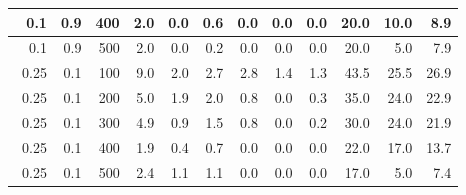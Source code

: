 \begin{longtable}{|r|r|r|r|r|r|r|r|r|r|r|r|}
        \hline \
        0.1                           & 0.9                     & 400                       & 2.0                       & 0.0                       & 0.6                       & 0.0                       & 0.0                       & 0.0                       & 20.0                      & 10.0                      & 8.9                      \\
        \hline \
        0.1                           & 0.9                     & 500                       & 2.0                       & 0.0                       & 0.2                       & 0.0                       & 0.0                       & 0.0                       & 20.0                      & 5.0                      & 7.9                      \\
        \hline \
        0.25                           & 0.1                     & 100                       & 9.0                       & 2.0                       & 2.7                       & 2.8                       & 1.4                       & 1.3                       & 43.5                      & 25.5                      & 26.9                      \\
        \hline \
        0.25                           & 0.1                     & 200                       & 5.0                       & 1.9                       & 2.0                       & 0.8                       & 0.0                       & 0.3                       & 35.0                      & 24.0                      & 22.9                      \\
        \hline \
        0.25                           & 0.1                     & 300                       & 4.9                       & 0.9                       & 1.5                       & 0.8                       & 0.0                       & 0.2                       & 30.0                      & 24.0                       & 21.9                       \\
        \hline \
        0.25                           & 0.1                    & 400                       & 1.9                       & 0.4                       & 0.7                       & 0.0                       & 0.0                       & 0.0                       & 22.0                      & 17.0                      & 13.7                      \\
        \hline \
        0.25                           & 0.1                    & 500                       & 2.4                       & 1.1                       & 1.1                       & 0.0                       & 0.0                       & 0.0                       & 17.0                      & 5.0                      & 7.4                      \\

\end{longtable}
